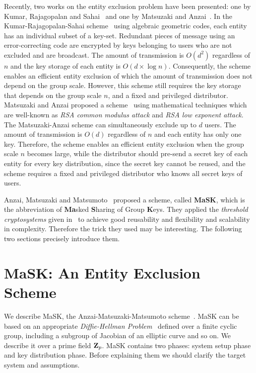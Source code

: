 \documentclass{ims9x6}
\begin{document}
Recently, two works on the entity exclusion problem have been
presented: one by Kumar, Rajagopalan and Sahai~\cite{kn:KRS} and one
by Matsuzaki and Anzai~\cite{kn:MA}. In the Kumar-Rajagopalan-Sahai
scheme~\cite{kn:KRS} using algebraic geometric codes,
each entity has an individual subset of a key-set. Redundant pieces of
message using an error-correcting code are encrypted by keys belonging
to users who are not excluded and are broadcast. The amount of
transmission is $O(d^2)$ regardless of $n$ and the key
storage of each entity is $O(d\times\log
n)$. Consequently, the scheme enables an efficient entity exclusion of
which the amount of transmission does not depend on the group
scale. However, this scheme still requires the key
storage that depends on the group scale $n$, and a fixed and
privileged distributor. \hbox{Matsuzaki} and Anzai proposed a
scheme~\cite{kn:MA} using mathematical techniques which are well-known
as {\em RSA common modulus attack\/} and {\em RSA low exponent
attack}. The Matsuzaki-Anzai scheme can simultaneously exclude up to
$d$ users. The amount of transmission is $O(d)$ regardless of $n$ and
each entity has only one key. Therefore, the scheme enables an
efficient entity exclusion when the group scale $n$ becomes large,
while the distributor should pre-send a
secret key of each entity for every key distribution,
since the secret key cannot be reused, and the scheme requires a fixed
and privileged distributor who knows all secret keys of
users.

Anzai, Matsuzaki and Matsumoto~\cite{kn:AMM4} proposed a scheme,
called {\bf MaSK}, which is the abbreviation of {\bf Ma}sked {\bf
S}haring of Group {\bf K}eys. They applied the {\em threshold
cryptosystems} given in~\cite{kn:DF} to achieve good reusability and
flexibility and scalability in complexity. Therefore the trick they
used may be interesting. The following two sections precisely
introduce them.

\section{MaSK: An Entity Exclusion Scheme}
We describe MaSK, the Anzai-Matsuzaki-Matsumoto scheme~\cite{kn:AMM4}.
MaSK can be based on an appropriate {\em Diffie-Hellman
Problem}~\cite{kn:MOV} defined over a finite cyclic group, including a
subgroup of Jacobian of an elliptic curve and so on. We describe it
over a prime field ${\bf Z}_p$. MaSK contains two phases: system
setup phase and key distribution
phase. Before explaining them we
should clarify the target system and assumptions.
\end{document}
